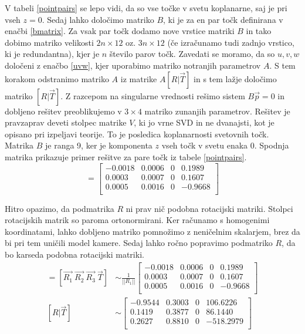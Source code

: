 \documentclass[a4paper, 12pt]{book}
\begin{document}
V tabeli \ref{pointpairs} se lepo vidi, da so vse točke v svetu koplanarne, saj je pri vseh $z = 0$. Sedaj lahko določimo matriko $B$, ki je za en par točk definirana v enačbi \eqref{bmatrix}. Za vsak par točk dodamo nove vrstice matriki $B$ in tako dobimo matriko velikosti $2n \times 12$ oz. $3n \times 12$ (če izračunamo tudi zadnjo vrstico, ki je redundantna), kjer je $n$ število parov točk. Zavedati se moramo, da so $u, v, w$ določeni z enačbo \eqref{uvw}, kjer uporabimo matriko notranjih parametrov $A$. S tem korakom odstranimo matriko $A$ iz matrike $A [R|\vec{T}]$ in s tem lažje določimo matriko $[R|\vec{T}]$. Z razcepom na singularne vrednosti rešimo sistem $B \vec{p} = 0$ in dobljeno rešitev preoblikujemo v $3 \times 4$ matriko zunanjih parametrov. Rešitev je pravzaprav deveti stolpec matrike $V$, ki jo vrne SVD in ne dvanajsti, kot je opisano pri izpeljavi teorije. To je posledica koplanarnosti svetovnih točk. Matrika $B$ je ranga 9, ker je komponenta $z$ vseh točk v svetu enaka 0. Spodnja matrika prikazuje primer rešitve za pare točk iz tabele \ref{pointpairs}.
\begin{equation}
[R|\vec{T}] = 
\begin{bmatrix}
-0.0018 & 0.0006 & 0 & 0.1989 \\
0.0003 & 0.0007 & 0 & 0.1607 \\
0.0005 & 0.0016  & 0 & -0.9668 \\
\end{bmatrix}
\end{equation}

Hitro opazimo, da podmatrika $R$ ni prav nič podobna rotacijski matriki. Stolpci rotacijskih matrik so paroma ortonormirani. Ker računamo s homogenimi koordinatami, lahko dobljeno matriko pomnožimo z neničelnim skalarjem, brez da bi pri tem uničili model kamere. Sedaj lahko ročno popravimo podmatriko $R$, da bo karseda podobna rotacijski matriki.
\begin{align}
[R|\vec{T}] = [\vec{R_1} \ \vec{R_2} \ \vec{R_3} \ \vec{T}] &\sim \frac{1}{||R_1||}
\begin{bmatrix}
-0.0018 & 0.0006 & 0 & 0.1989 \\
0.0003 & 0.0007 & 0 & 0.1607 \\
0.0005 & 0.0016  & 0 & -0.9668 \\
\end{bmatrix} \\
[R|\vec{T}] &\sim
\begin{bmatrix}
-0.9544 & 0.3003 & 0 & 106.6226 \\
0.1419 & 0.3877 & 0 & 86.1440 \\
0.2627 & 0.8810 & 0 & -518.2979 \\
\end{bmatrix}
\end{align}
\end{document}
